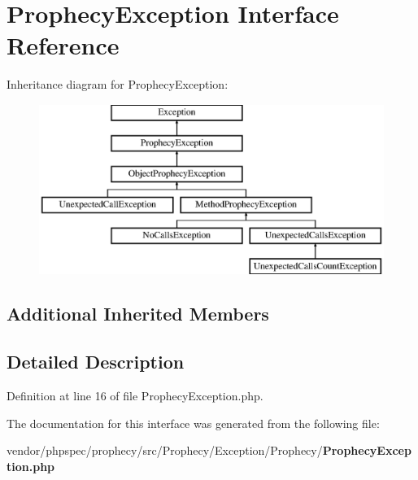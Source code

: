 \section{Prophecy\+Exception Interface Reference}
\label{interface_prophecy_1_1_exception_1_1_prophecy_1_1_prophecy_exception}
Inheritance diagram for Prophecy\+Exception\+:\begin{figure}[H]
\begin{center}
\leavevmode
\includegraphics[height=5.544555cm]{interface_prophecy_1_1_exception_1_1_prophecy_1_1_prophecy_exception}
\end{center}
\end{figure}
\subsection*{Additional Inherited Members}


\subsection{Detailed Description}


Definition at line 16 of file Prophecy\+Exception.\+php.



The documentation for this interface was generated from the following file\+:\begin{DoxyCompactItemize}
\item 
vendor/phpspec/prophecy/src/\+Prophecy/\+Exception/\+Prophecy/{\bf Prophecy\+Exception.\+php}\end{DoxyCompactItemize}
